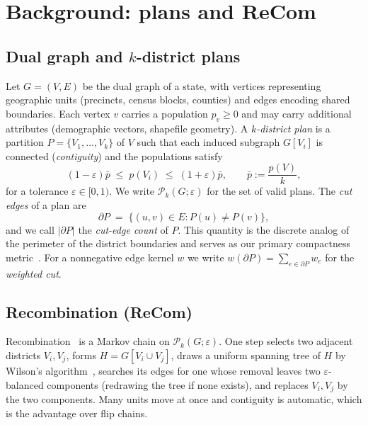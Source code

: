 \documentclass[11pt]{article}
\begin{document}
\section{Background: plans and ReCom}\label{sec:background}

\subsection{Dual graph and \texorpdfstring{$k$}{k}-district plans}\label{sec:background-graph}

Let $G = (V, E)$ be the dual graph of a state, with vertices
representing geographic units (precincts, census blocks, counties) and
edges encoding shared boundaries. Each vertex $v$ carries a population
$p_v \ge 0$ and may carry additional attributes (demographic vectors,
shapefile geometry). A \emph{$k$-district plan} is a partition
$P = \{V_1, \ldots, V_k\}$ of $V$ such that each induced subgraph
$G[V_i]$ is connected (\emph{contiguity}) and the populations satisfy
\begin{equation}\label{eq:pop-balance}
  (1 - \varepsilon)\bar p \;\le\; p(V_i) \;\le\; (1 + \varepsilon)\bar p,
  \qquad \bar p := \frac{p(V)}{k},
\end{equation}
for a tolerance $\varepsilon \in [0, 1)$. We write $\mathcal{P}_k(G; \varepsilon)$
for the set of valid plans. The \emph{cut edges} of a plan are
\[
  \partial P \;=\; \{(u,v) \in E : P(u) \ne P(v)\},
\]
and we call $|\partial P|$ the \emph{cut-edge count} of $P$. This
quantity is the discrete analog of the perimeter of the district
boundaries and serves as our primary compactness
metric~\cite{duchin2018discrete}. For a nonnegative edge kernel $w$ we
write $w(\partial P) = \sum_{e \in \partial P} w_e$ for the
\emph{weighted cut}.


\subsection{Recombination (ReCom)}\label{sec:background-recom}

Recombination~\cite{deford2021recombination} is a Markov chain on
$\mathcal{P}_k(G; \varepsilon)$. One step selects two adjacent
districts $V_i, V_j$, forms $H = G[V_i \cup V_j]$, draws a uniform
spanning tree of $H$ by Wilson's algorithm~\cite{wilson1996generating},
searches its edges for one whose removal leaves two
$\varepsilon$-balanced components (redrawing the tree if none exists),
and replaces $V_i, V_j$ by the two components. Many units move at
once and contiguity is automatic, which is the advantage over flip
chains.
\end{document}
